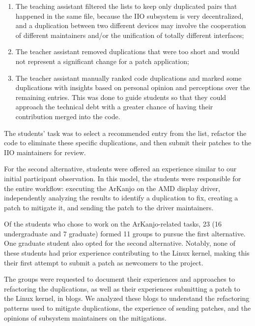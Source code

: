 \begin{enumerate}
    \item The teaching assistant filtered the lists to keep only duplicated pairs that happened in the same file, because the IIO subsystem is very decentralized, and a duplication between two different devices may involve the cooperation of different maintainers and/or the unification of totally different interfaces;
    \item The teacher assistant removed duplications that were too short and would not represent a significant change for a patch application;
    \item The teacher assistant manually ranked code duplications and marked some duplications with insights based on personal opinion and perceptions over the remaining entries. This was done to guide students so that they could approach the technical debt with a greater chance of having their contribution merged into the code.
\end{enumerate}

The students' task was to select a recommended entry from the list, refactor the code to eliminate 
these specific duplications, and then submit their patches to the IIO maintainers for review.

For the second alternative, students were offered an experience similar to our initial participant
observation. In this model, the students were responsible for the entire workflow: executing the
ArKanjo on the AMD display driver, independently analyzing the results to identify a duplication
to fix, creating a patch to mitigate it, and sending the patch to the driver maintainers.

Of the students who chose to work on the ArKanjo-related tasks, 23 (16 undergraduate and 7 graduate)
formed 11 groups to pursue the first alternative. One graduate student also opted for the second 
alternative. Notably, none of these students had prior experience contributing to the Linux kernel, 
making this their first attempt to submit a patch as newcomers to the project.

The groups were requested to document their experiences and approaches to refactoring the duplications, as well as their experiences submitting a patch to the Linux kernel, in blogs. We analyzed these blogs to understand the refactoring patterns used to mitigate duplications, the experience of sending patches, and the opinions of subsystem maintainers on the mitigations.
